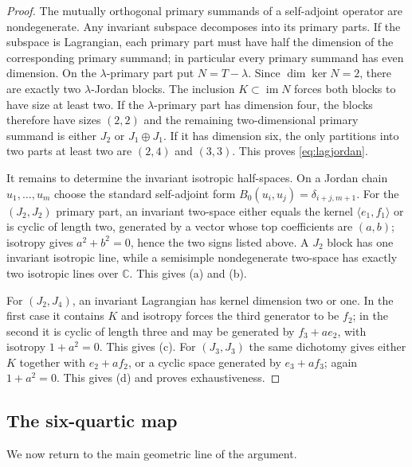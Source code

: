 \documentclass[11pt,reqno]{amsart}
\theoremstyle{remark}
\begin{document}
\begin{proof}
The mutually orthogonal primary summands of a self-adjoint operator are nondegenerate.  Any invariant subspace decomposes into its primary parts.  If the subspace is Lagrangian, each primary part must have half the dimension of the corresponding primary summand; in particular every primary summand has even dimension.  On the $\lambda$-primary part put $N=T-\lambda$.  Since $\dim\ker N=2$, there are exactly two $\lambda$-Jordan blocks.  The inclusion $K\subset\operatorname{im}N$ forces both blocks to have size at least two.  If the $\lambda$-primary part has dimension four, the blocks therefore have sizes $(2,2)$ and the remaining two-dimensional primary summand is either $J_2$ or $J_1\oplus J_1$.  If it has dimension six, the only partitions into two parts at least two are $(2,4)$ and $(3,3)$.  This proves \eqref{eq:lagjordan}.

It remains to determine the invariant isotropic half-spaces.  On a Jordan chain $u_1,\ldots,u_m$ choose the standard self-adjoint form $B_0(u_i,u_j)=\delta_{i+j,m+1}$.  For the $(J_2,J_2)$ primary part, an invariant two-space either equals the kernel $\langle e_1,f_1\rangle$ or is cyclic of length two, generated by a vector whose top coefficients are $(a,b)$; isotropy gives $a^2+b^2=0$, hence the two signs listed above.  A $J_2$ block has one invariant isotropic line, while a semisimple nondegenerate two-space has exactly two isotropic lines over $\mathbb C$.  This gives (a) and (b).

For $(J_2,J_4)$, an invariant Lagrangian has kernel dimension two or one.  In the first case it contains $K$ and isotropy forces the third generator to be $f_2$; in the second it is cyclic of length three and may be generated by $f_3+a e_2$, with isotropy $1+a^2=0$.  This gives (c).  For $(J_3,J_3)$ the same dichotomy gives either $K$ together with $e_2+a f_2$, or a cyclic space generated by $e_3+a f_3$; again $1+a^2=0$.  This gives (d) and proves exhaustiveness.
\end{proof}

\subsection{The six-quartic map}
We now return to the main geometric line of the argument.
\end{document}
